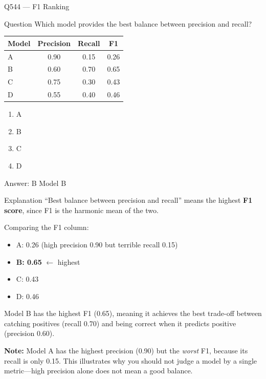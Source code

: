 \documentclass[aspectratio=169,8pt]{beamer}
\begin{document}
	\begin{frame}{Q544 --- F1 Ranking}
		\begin{block}{Question}
			Which model provides the best balance between precision and recall?
			
			\begin{center}
				\begin{tabular}{lccc}
					\hline
					Model & Precision & Recall & F1 \\
					\hline
					A & 0.90 & 0.15 & 0.26 \\
					B & 0.60 & 0.70 & 0.65 \\
					C & 0.75 & 0.30 & 0.43 \\
					D & 0.55 & 0.40 & 0.46 \\
					\hline
				\end{tabular}
			\end{center}
			
			\begin{enumerate}
				\item A
				\item B
				\item C
				\item D
			\end{enumerate}
		\end{block}
		
		\begin{exampleblock}{Answer: B}
			Model B
		\end{exampleblock}
		
		\begin{block}{Explanation}
			``Best balance between precision and recall'' means the highest \textbf{F1 score},
			since F1 is the harmonic mean of the two.
			
			Comparing the F1 column:
			\begin{itemize}
				\item A: 0.26 (high precision 0.90 but terrible recall 0.15)
				\item \textbf{B: 0.65} \(\leftarrow\) highest
				\item C: 0.43
				\item D: 0.46
			\end{itemize}
			
			Model B has the highest F1 (0.65), meaning it achieves the best trade-off
			between catching positives (recall 0.70) and being correct when it predicts
			positive (precision 0.60).
			
			\textbf{Note:} Model A has the highest precision (0.90) but the \emph{worst}
			F1, because its recall is only 0.15. This illustrates why you should not
			judge a model by a single metric---high precision alone does not mean a
			good balance.
		\end{block}
	\end{frame}
	
\end{document}
